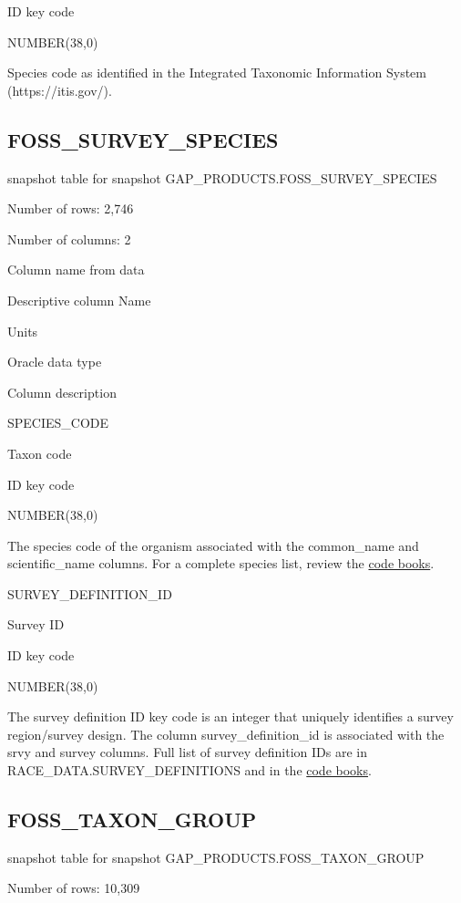 \documentclass[
  letterpaper,
  oneside,
  open=any]{scrbook}
\begin{document}
ID key code

NUMBER(38,0)

Species code as identified in the Integrated Taxonomic Information
System (https://itis.gov/).

\subsection{FOSS\_SURVEY\_SPECIES}\label{foss_survey_species}

snapshot table for snapshot GAP\_PRODUCTS.FOSS\_SURVEY\_SPECIES

Number of rows: 2,746

Number of columns: 2

Column name from data

Descriptive column Name

Units

Oracle data type

Column description

SPECIES\_CODE

Taxon code

ID key code

NUMBER(38,0)

The species code of the organism associated with the common\_name and
scientific\_name columns. For a complete species list, review the
\href{https://www.fisheries.noaa.gov/resource/document/groundfish-survey-species-code-manual-and-data-codes-manual}{code
books}.

SURVEY\_DEFINITION\_ID

Survey ID

ID key code

NUMBER(38,0)

The survey definition ID key code is an integer that uniquely identifies
a survey region/survey design. The column survey\_definition\_id is
associated with the srvy and survey columns. Full list of survey
definition IDs are in RACE\_DATA.SURVEY\_DEFINITIONS and in the
\href{https://www.fisheries.noaa.gov/resource/document/groundfish-survey-species-code-manual-and-data-codes-manual}{code
books}.

\subsection{FOSS\_TAXON\_GROUP}\label{foss_taxon_group}

snapshot table for snapshot GAP\_PRODUCTS.FOSS\_TAXON\_GROUP

Number of rows: 10,309
\end{document}
